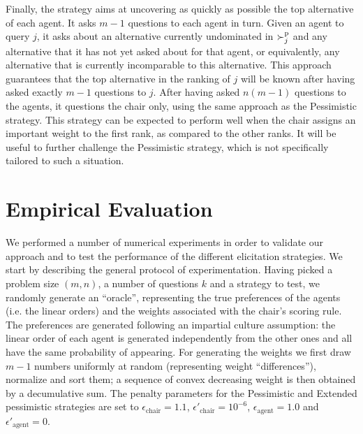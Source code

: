 \documentclass[sigconf, anonymous]{aamas}
\begin{document}
Finally, the  strategy aims at uncovering as quickly as possible the top alternative of each agent. It asks $m - 1$ questions to each agent in turn. 
Given an agent to query $j$, it asks about an alternative currently undominated in $\succ^\text{p}_j$ and any alternative that it has not yet asked about for that agent, or equivalently, any alternative that is currently incomparable to this alternative. This approach guarantees that the top alternative in the ranking of $j$ will be known after having asked exactly $m-1$ questions to $j$.
After having asked $n (m-1)$ questions to the agents, it questions the chair only, using the same approach as the Pessimistic strategy.
This strategy can be expected to perform well when the chair assigns an important weight to the first rank, as compared to the other ranks. It will be useful to further challenge the Pessimistic strategy, which is not specifically tailored to such a situation.


\section{Empirical Evaluation} 
\label{sec:experiments}
We  performed a number of numerical experiments in order to validate our approach and to test the performance of the different elicitation strategies. %
We start by describing the general protocol of experimentation. %
Having picked a problem size $(m, n)$, a number of questions $k$ and a strategy to test, we randomly generate an “oracle”, representing the true preferences of the agents (i.e. the linear orders) and the weights associated with the chair's scoring rule. 
The preferences are generated following an impartial culture assumption: the linear order of each agent is generated independently from the other ones and all have the same probability of appearing. 
For generating the weights we first draw $m - 1$ numbers uniformly at random (representing weight ``differences''), normalize and sort them; 
a sequence of convex decreasing weight is then obtained by a decumulative sum.
The penalty parameters for the Pessimistic and Extended pessimistic strategies are set to $\epsilon_{\text{chair}} = 1.1$, $\epsilon'_{\text{chair}} = 10^{-6}$, $\epsilon_{\text{agent}} = 1.0$ and $\epsilon'_{\text{agent}} = 0$.
\end{document}
